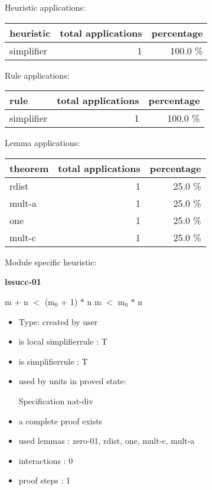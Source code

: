 \documentclass[a4paper]{article}
\begin{document}
\medskip


Heuristic applications:

\begin{supertabular}{l|r|r}
heuristic	& total applications & percentage \\ \hline
simplifier & 1 & 100.0 \% \\

\end{supertabular}

Rule applications:

\begin{supertabular}{l|r|r}
rule	        & total applications & percentage \\ \hline
simplifier & 1 & 100.0 \% \\

\end{supertabular}

Lemma applications:

\begin{supertabular}{l|r|r}
theorem	        & total applications & percentage \\ \hline
rdist & 1 & 25.0 \% \\
mult-a & 1 & 25.0 \% \\
one & 1 & 25.0 \% \\
mult-c & 1 & 25.0 \% \\

\end{supertabular}

Module specific heuristic:

\pagebreak

{\LARGE\bf lssucc-01}\label{lemma-lssucc-01}

\medskip

 \Fol m + n $<$ ($\mbox{m}_{0}$ + 1) $*$ n \Equiv m $<$ $\mbox{m}_{0}$ $*$ n

\begin{itemize}

\item Type: created by user

\item is local simplifierrule : T
\item is simplifierrule : T
\item used by units in proved state:

Specification nat-div
\item       a complete proof exists
\item       used lemmas  : zero-01, rdist, one, mult-c, mult-a
\item       interactions : 0
\item       proof steps  : 1
\end{itemize}
\end{document}

